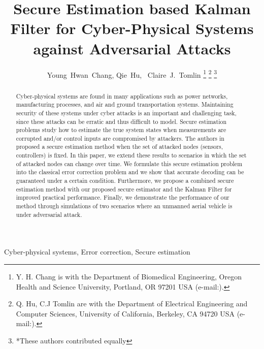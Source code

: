 \documentclass[journal]{IEEEtran}
\begin{document}
\title{Secure Estimation based Kalman Filter for Cyber-Physical Systems against Adversarial Attacks}





\author{Young~Hwan~Chang, Qie~Hu, ~Claire~J.~Tomlin
\thanks{Y. H. Chang is with the Department of Biomedical Engineering, Oregon Health and Science University, Portland, OR 97201 USA (e-mail:).}
\thanks{Q. Hu, C.J Tomlin are with the Department of Electrical Engineering and Computer Sciences, University of California, Berkeley, CA 94720 USA (e-mail:).}
\thanks{*These authors contributed equally}}










\maketitle

\begin{abstract}
Cyber-physical systems are found in many applications such as power networks, manufacturing processes, and air and ground transportation systems. Maintaining security of these systems under cyber attacks is an important and challenging task, since these attacks can be erratic and thus difficult to model. Secure estimation problems study how to estimate the true system states when  measurements are corrupted and/or control inputs are compromised by attackers. The authors in \cite{Fawzi2014} proposed a secure estimation method when the set of attacked nodes (sensors, controllers) is fixed. In this paper, we extend these results to scenarios in which the set of attacked nodes can change over time. We formulate this secure estimation problem into the classical error correction problem \cite{Candes_Tao} and we show that accurate decoding can be guaranteed under a certain condition.
Furthermore, we propose a combined secure estimation method with our proposed secure estimator and the Kalman Filter for improved practical performance. Finally,  we demonstrate the performance of our method through simulations of two scenarios where an unmanned aerial vehicle is under adversarial attack.

\end{abstract}



\begin{IEEEkeywords}
Cyber-physical systems, Error correction, Secure estimation
\end{IEEEkeywords}
\end{document}
